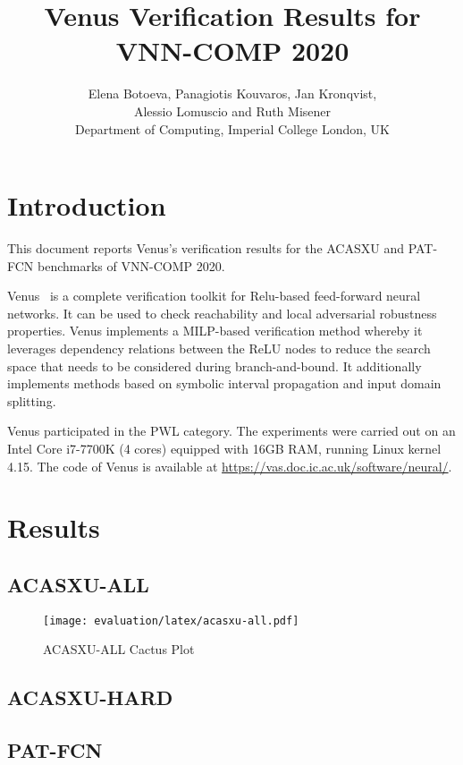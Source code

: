 \documentclass[letterpaper]{article}
\title{Venus Verification Results for VNN-COMP 2020}
\author{Elena Botoeva, Panagiotis Kouvaros, Jan Kronqvist, \\ Alessio
Lomuscio and Ruth Misener \\ Department of Computing, Imperial College
London, UK}
\begin{document}
\maketitle

\section{Introduction}

This document reports Venus's verification results for  the ACASXU and
PAT-FCN benchmarks of VNN-COMP 2020.

Venus~\cite{Botoeva+20} is a complete verification toolkit for
Relu-based feed-forward neural networks. It can be used to check
reachability and local adversarial robustness properties. Venus
implements a MILP-based verification method whereby it leverages
dependency relations between the ReLU nodes to reduce the search space
that needs to be considered during branch-and-bound. It additionally
implements methods based on symbolic interval propagation and input
domain splitting.

Venus participated in the PWL category. The experiments were carried
out on an Intel   Core i7-7700K  (4  cores)  equipped  with  16GB
RAM,  running Linux kernel 4.15. The code of Venus is available at
\url{https://vas.doc.ic.ac.uk/software/neural/}.

\section{Results}

\subsection{ACASXU-ALL}

\begin{figure}[H]
	\centering
	\texttt{[image: evaluation/latex/acasxu-all.pdf]}
	\caption{ACASXU-ALL Cactus Plot}
\end{figure}




\subsection{ACASXU-HARD}





\subsection{PAT-FCN}
\end{document}
